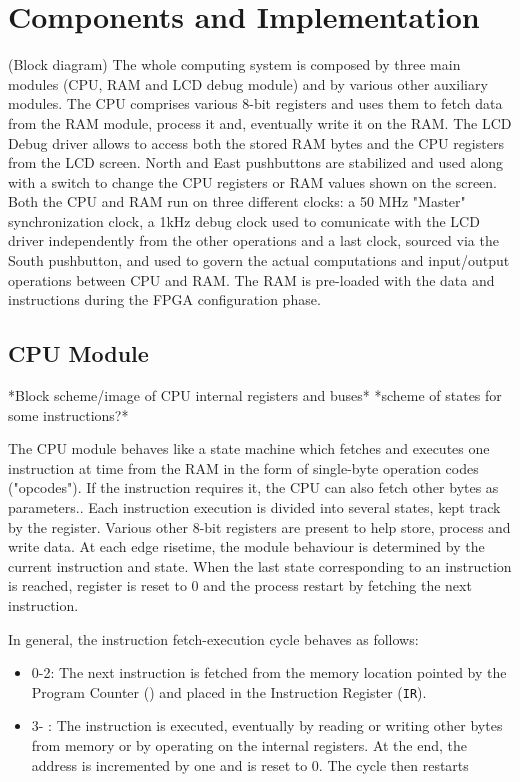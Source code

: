 \section{Components and Implementation} \label{sec:impl}
(Block diagram)
The whole computing system is composed by three main modules (CPU, RAM and LCD debug module)
and by various other auxiliary modules.
The CPU comprises various 8-bit registers and uses them to fetch data from the RAM module, process it and, eventually write it on the RAM.
The LCD Debug driver allows to access both the stored RAM bytes and the CPU registers from the LCD screen.
North and East pushbuttons are stabilized and used along with a switch to change the CPU registers or RAM values shown on the screen.
Both the CPU and RAM run on three different clocks: a 50 MHz "Master" synchronization clock,
 a 1kHz debug clock used to comunicate with the LCD driver independently from the other operations
 and a last clock, sourced via the South pushbutton, and used to govern the actual computations and input/output operations between CPU and RAM.
The RAM is pre-loaded with the data and instructions during the FPGA configuration phase.


\subsection{CPU Module}  \label{ssec:cpu}
*Block scheme/image of CPU internal registers and buses*
*scheme of states for some instructions?*

The CPU module behaves like a state machine which fetches and executes one instruction at time from the RAM in the form of single-byte operation codes ("opcodes").
If the instruction requires it, the CPU can also fetch other bytes as parameters..
Each instruction execution is divided into several states, kept track by the  register.
Various other 8-bit registers are present to help store, process and write data.
At each  edge risetime, the module behaviour is determined by the current instruction and state.
When the last state corresponding to an instruction is reached,  register is reset to 0 and the process
restart by fetching the next instruction.

In general, the instruction fetch-execution cycle behaves as follows:
\begin{itemize}
    \item {} 0-2: The next instruction is fetched from the memory location pointed by the Program Counter () and placed in the Instruction Register (\texttt{IR}).
    \item {} 3- : The instruction is executed, eventually by reading or writing other bytes from memory or by operating on the internal registers. At the end, the  address is incremented by one and  is reset to 0. The cycle then restarts
\end{itemize}

